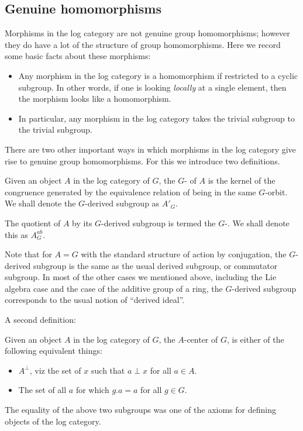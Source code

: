 \documentclass[a4paper]{amsart}
\begin{document}
\subsection{Genuine homomorphisms}

Morphisms in the log category are not genuine group homomorphisms;
however they do have a lot of the structure of group
homomorphisms. Here we record some basic facts about these morphisms:

\begin{itemize}

\item Any morphism in the log category is a homomorphism if restricted
  to a cyclic subgroup. In other words, if one is looking {\em
    locally} at a single element, then the morphism looks like a homomorphism.

\item In particular, any morphism in the log category takes the
  trivial subgroup to the trivial subgroup.

\end{itemize}

There are two other important ways in which morphisms in the log
category give rise to genuine group homomorphisms. For this we
introduce two definitions.

\begin{definer}
  Given an object $A$ in the log category of $G$, the
  $G$- of $A$ is the kernel of the
  congruence generated by the equivalence relation of being in the
  same $G$-orbit. We shall denote the $G$-derived subgroup as $A'_G$.

  The quotient of $A$ by its $G$-derived subgroup is termed the
  $G$-. We shall denote this as $A^{ab}_G$.
\end{definer}

Note that for $A = G$ with the standard structure of action by
conjugation, the $G$-derived subgroup is the same as the usual derived
subgroup, or commutator subgroup. In most of the other cases we
mentioned above, including the Lie algebra case and the case of the
additive group of a ring, the $G$-derived subgroup corresponds to the
usual notion of ``derived ideal''.

A second definition:

\begin{definer}[$G$-center]
  Given an object $A$ in the log category of $G$, the $A$-center of
  $G$, is either of the following equivalent things:

  \begin{itemize}

  \item $A^\perp$, viz the set of $x$ such that $a \perp x$ for all $a
    \in A$.

  \item The set of all $a$ for which $g.a = a$ for all $g \in G$.

  \end{itemize}
  
  The equality of the above two subgroups was one of the axioms for
  defining objects of the log category.
\end{definer}
\end{document}
